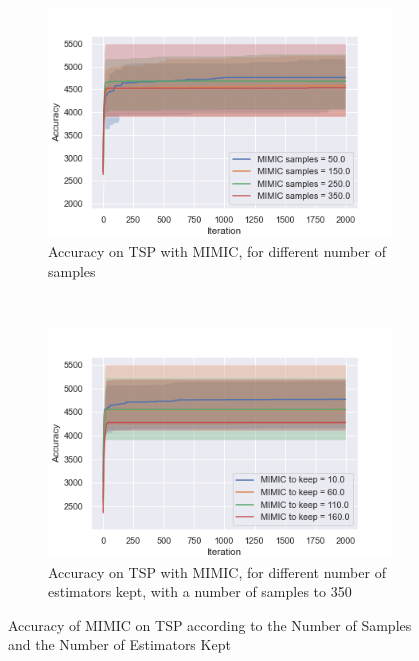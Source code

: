 \documentclass[10pt]{article}
\begin{document}
				\begin{figure}[h]
					\centering
					\begin{subfigure}[t]{0.45\columnwidth}
						\centering
						\includegraphics[width=\linewidth]{../graphics/tsp_MIMIC_Iteration_Error_MIMIC_samples.png}
						\caption{Accuracy on TSP with MIMIC, for different number of samples}
						\label{tsp:mimic_samples}
					\end{subfigure}
					~
					\begin{subfigure}[t]{0.45\columnwidth}
						\centering
						\includegraphics[width=\linewidth]{../graphics/tsp_MIMIC_Iteration_Error_MIMIC_to_keep.png}
						\caption{Accuracy on TSP with MIMIC, for different number of estimators kept, with a number of samples to 350}
						\label{tsp:mimic_to_keep}
					\end{subfigure}
					\caption{Accuracy of MIMIC on TSP according to the Number of Samples and the Number of Estimators Kept}
					\label{tsp:mimic}
				\end{figure}
\end{document}
